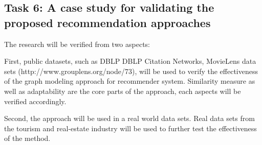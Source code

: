 \subsection{Task 6:  A case study for validating the proposed recommendation approaches}

The research will be verified from two aspects: 

First, public datasets, such as DBLP DBLP Citation Networks, MovieLens data sets (http://www.grouplens.org/node/73), will be used to verify the effectiveness of the graph modeling approach for recommender system. Similarity measure as well as adaptability are the core parts of the approach, each aspects will be verified accordingly. 

Second, the approach will be used in a real world data sets. Real data sets from the tourism and real-estate industry will be used to further test the effectiveness of the method.


